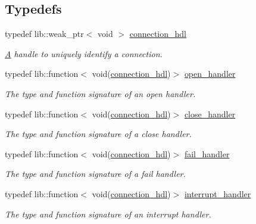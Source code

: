 \subsection*{Typedefs}
\begin{DoxyCompactItemize}
\item 
typedef lib\+::weak\+\_\+ptr$<$ void $>$ \mbox{\hyperlink{namespacewebsocketpp_a6b3d26a10ee7229b84b776786332631d}{connection\+\_\+hdl}}
\begin{DoxyCompactList}\small\item\em \mbox{\hyperlink{struct_a}{A}} handle to uniquely identify a connection. \end{DoxyCompactList}\item 
typedef lib\+::function$<$ void(\mbox{\hyperlink{namespacewebsocketpp_a6b3d26a10ee7229b84b776786332631d}{connection\+\_\+hdl}})$>$ \mbox{\hyperlink{namespacewebsocketpp_a53c8b4ae59cf13b5f883b119bbd14d72}{open\+\_\+handler}}
\begin{DoxyCompactList}\small\item\em The type and function signature of an open handler. \end{DoxyCompactList}\item 
typedef lib\+::function$<$ void(\mbox{\hyperlink{namespacewebsocketpp_a6b3d26a10ee7229b84b776786332631d}{connection\+\_\+hdl}})$>$ \mbox{\hyperlink{namespacewebsocketpp_a27acb39e01cbca06ccc4e4e8eb8f877d}{close\+\_\+handler}}
\begin{DoxyCompactList}\small\item\em The type and function signature of a close handler. \end{DoxyCompactList}\item 
typedef lib\+::function$<$ void(\mbox{\hyperlink{namespacewebsocketpp_a6b3d26a10ee7229b84b776786332631d}{connection\+\_\+hdl}})$>$ \mbox{\hyperlink{namespacewebsocketpp_a5bb2e61cfe649b2e012f1a2c5693a4d5}{fail\+\_\+handler}}
\begin{DoxyCompactList}\small\item\em The type and function signature of a fail handler. \end{DoxyCompactList}\item 
typedef lib\+::function$<$ void(\mbox{\hyperlink{namespacewebsocketpp_a6b3d26a10ee7229b84b776786332631d}{connection\+\_\+hdl}})$>$ \mbox{\hyperlink{namespacewebsocketpp_a55f6947df7673a9de3c44b6bd5d4a82a}{interrupt\+\_\+handler}}
\begin{DoxyCompactList}\small\item\em The type and function signature of an interrupt handler. \end{DoxyCompactList}\item 

\end{DoxyCompactItemize}
